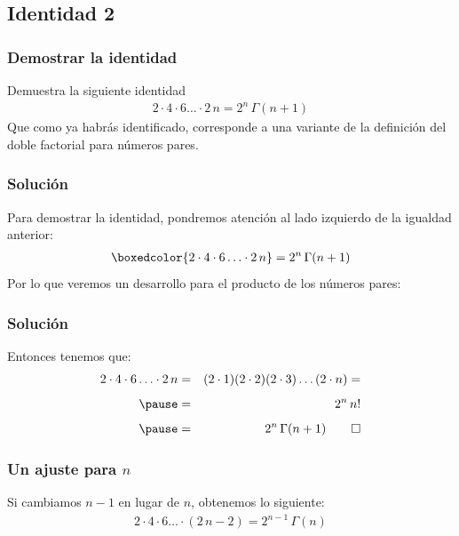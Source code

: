 \subsection{Identidad 2}
\begin{frame}
\frametitle{Demostrar la identidad}
Demuestra la siguiente identidad
\begin{align*}
2 \cdot 4 \cdot 6 \ldots \cdot 2 \, n = 2^{n} \, \Gamma (n + 1)
\end{align*}
\pause
Que como ya habrás identificado, corresponde a una variante de la definición del doble factorial para números pares.
\end{frame}
\begin{frame}[t]
\frametitle{Solución}
Para demostrar la identidad, pondremos atención al lado izquierdo de la igualdad anterior:
\pause
\begin{align*}
\boxedcolor{2 \cdot 4 \cdot 6 \ldots \cdot 2 \, n } = 2^{n} \, \Gamma (n + 1)
\end{align*}
\pause
Por lo que veremos un desarrollo para el producto de los números pares:
\end{frame}
\begin{frame}
\frametitle{Solución}
Entonces tenemos que:
\begin{eqnarray}
2 \cdot 4 \cdot 6 \ldots \cdot 2 \, n  &=& (2 \cdot 1) (2 \cdot 2) (2 \cdot 3) \ldots (2 \cdot n) = \nonumber \\[0.5em] \pause
&=& 2^{n} \, n! \nonumber \\[0.5em] \pause
&=& 2^{n} \, \Gamma (n + 1) \qed \label{eq:ecuacion_01_16}
\end{eqnarray}
\end{frame}
\begin{frame}
\frametitle{Un ajuste para $n$}
Si cambiamos $n - 1$ en lugar de $n$, obtenemos lo siguiente:
\begin{align*}
2 \cdot 4 \cdot 6 \ldots \cdot (2 \, n - 2)  = 2^{n-1} \, \Gamma (n)
\end{align*}
\end{frame}

